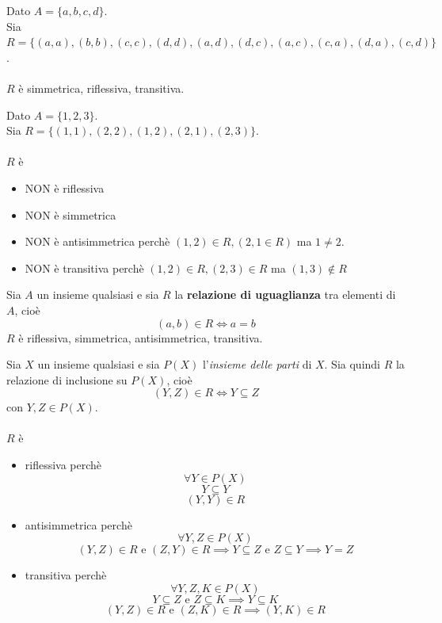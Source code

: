 \documentclass[a4paper,12pt, oneside]{book}
\begin{document}
\begin{shaded}
	\begin{esempio}
		Dato $A = \{a,b,c,d\}$.\\
		Sia $R = \{(a,a), (b,b), (c,c), (d,d), (a,d), (d,c), (a,c), (c,a), (d,a), (c,d)\}$.\\\\
		$R$ è simmetrica, riflessiva, transitiva.
	\end{esempio}
	\begin{esempio}
		Dato $A = \{1,2,3\}$.\\
		Sia $R = \{(1,1), (2,2), (1,2), (2,1), (2,3)\}$.\\\\
		$R$ è \begin{itemize}
			\item NON è riflessiva
			\item NON è simmetrica
			\item NON è antisimmetrica perchè $(1,2) \in R, (2,1 \in R)$ ma $1 \not = 2$.
			\item NON è transitiva perchè $(1,2) \in R, (2,3) \in R$ ma $(1,3) \not\in R$
		\end{itemize}
	\end{esempio}
	\begin{esempio}
		Sia $A$ un insieme qualsiasi e sia $R$ la \textbf{relazione di uguaglianza} tra elementi di $A$, cioè $$(a,b) \in R \iff a=b$$
		$R$ è riflessiva, simmetrica, antisimmetrica, transitiva.
	\end{esempio}
	\begin{esempio}
		Sia $X$ un insieme qualsiasi e sia $P(X)$ l'\textit{insieme delle parti} di $X$.
		Sia quindi $R$  la relazione di inclusione su $P(X)$, cioè
		$$(Y,Z) \in R \iff Y \subseteq Z $$
		con $Y,Z \in P(X)$.\\\\
		$R$ è \begin{itemize}
			\item riflessiva perchè $$\forall Y \in P(X)$$ $$Y \subseteq Y$$ $$(Y,Y) \in R$$
			\item antisimmetrica perchè $$\forall Y,Z \in P(X)$$ $$(Y,Z) \in R \mbox{ e } (Z,Y) \in R \implies Y \subseteq Z \mbox{ e } Z \subseteq Y \implies Y=Z$$
			\item transitiva perchè $$\forall Y,Z,K \in P(X)$$ $$Y \subseteq Z \mbox{ e } Z \subseteq K \implies Y \subseteq K$$ $$(Y,Z) \in R \mbox{ e } (Z,K) \in R \implies (Y,K) \in R$$
		\end{itemize}
	\end{esempio}

\end{shaded}
\end{document}
